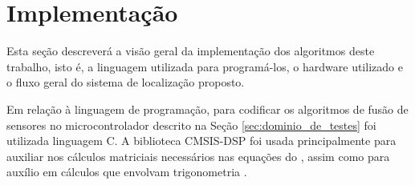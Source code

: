 \documentclass[acronym, symbols, table]{fei}
\begin{document}
%	
%		
%		
%		
		
	\section{Implementação}
	
		Esta seção descreverá a visão geral da implementação dos algoritmos deste trabalho, isto é, a linguagem utilizada para programá-los, o hardware utilizado e o fluxo geral do sistema de localização proposto.
		
		Em relação à linguagem de programação, para codificar os algoritmos de fusão de sensores no microcontrolador descrito na Seção \ref{sec:dominio_de_testes} foi utilizada linguagem C. A biblioteca CMSIS-DSP foi usada principalmente para auxiliar nos cálculos matriciais necessários nas equações do , assim como para auxílio em cálculos que envolvam trigonometria \cite{cmsis_dsp}.
		
\end{document}

